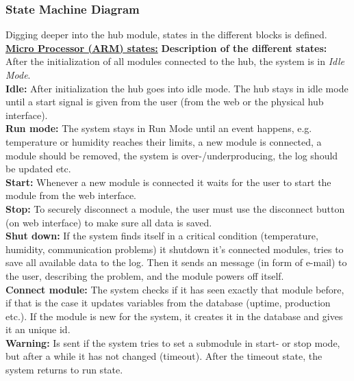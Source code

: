 \subsubsection{State Machine Diagram}
Digging deeper into the hub module, states in the different blocks is defined. 
\p \underline{\textbf{Micro Processor (ARM) states:}}
\p \textbf{Description of the different states: }
	\\ After the initialization of all modules connected to the hub, the system is in  \textit{Idle Mode}.
	\\\textbf{Idle: } After initialization the hub goes into idle mode. The hub stays in idle mode until a start signal is given from the user (from the web or the physical hub interface). 
	\\\textbf{Run mode: }The system stays in Run Mode until an event happens, e.g. temperature or humidity reaches their limits, a new module is connected, a module should be removed, the system is over-/underproducing, the log should be updated etc.
	\\\textbf{Start: }Whenever a new module is connected it waits for the user to start the module from the web interface.
	\\\textbf{Stop: }To securely disconnect a module, the user must use the disconnect button (on web interface) to make sure all data is saved.
	\\\textbf{Shut down: }If the system finds itself in a critical condition (temperature, humidity, communication problems) it shutdown it's connected modules, tries to save all available data to the log. Then it sends an message (in form of e-mail) to the user, describing the problem, and the module powers off itself. 
	\\\textbf{Connect module: } The system checks if it has seen exactly that module before, if that is the case it updates variables from the database (uptime, production etc.). If the module is new for the system, it creates it in the database and gives it an unique id.
	\\\textbf{Warning: }Is sent if the system tries to set a submodule in start- or stop mode, but after a while it has not changed (timeout). After the timeout state, the system returns to run state.
